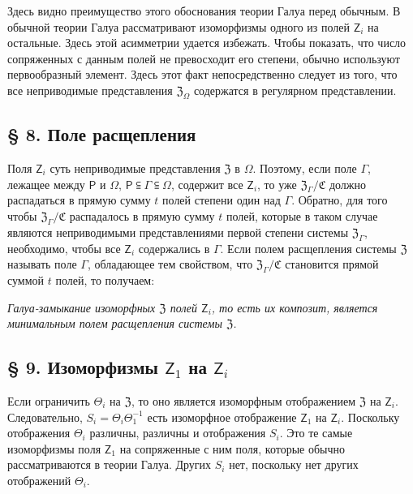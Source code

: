 \documentclass[11pt]{article}
\begin{document}
Здесь видно преимущество этого обоснования теории Галуа перед обычным. В обычной теории Галуа рассматривают изоморфизмы одного из полей \(\mathsf{Z}_i\) на остальные. Здесь этой асимметрии удается избежать. Чтобы показать, что число сопряженных с данным полей не превосходит его степени, обычно используют первообразный элемент. Здесь этот факт непосредственно следует из того, что все неприводимые представления \(\mathfrak Z_\Omega\) содержатся в регулярном представлении.

\subsection*{§ 8. Поле расщепления}\label{der-zerfaellungskoerper}

Поля \(\mathsf{Z}_i\) суть неприводимые представления \(\mathfrak Z\) в \(\Omega\). Поэтому, если поле \(\Gamma\), лежащее между \(\mathsf P\) и \(\Omega\), \(\mathsf P\subseteqq\Gamma\subseteqq\Omega\), содержит все \(\mathsf{Z}_i\), то уже \(\mathfrak Z_\Gamma/\mathfrak C\) должно распадаться в прямую сумму \(t\) полей степени один над \(\Gamma\). Обратно, для того чтобы \(\mathfrak Z_\Gamma/\mathfrak C\) распадалось в прямую сумму \(t\) полей, которые в таком случае являются неприводимыми представлениями первой степени системы \(\mathfrak Z_\Gamma\), необходимо, чтобы все \(\mathsf{Z}_i\) содержались в \(\Gamma\). Если полем расщепления системы \(\mathfrak Z\) называть поле \(\Gamma\), обладающее тем свойством, что \(\mathfrak Z_\Gamma/\mathfrak C\) становится прямой суммой \(t\) полей, то получаем:

\emph{Галуа-замыкание изоморфных \(\mathfrak Z\) полей \(\mathsf{Z}_i\), то есть их композит, является минимальным полем расщепления системы \(\mathfrak Z\).}

\subsection*{§ 9. Изоморфизмы \(\mathsf{Z}_1\) на \(\mathsf{Z}_i\)}\label{die-isomorphismen-von-z1-auf-die-zi}

Если ограничить \(\Theta_i\) на \(\mathfrak Z\), то оно является изоморфным отображением \(\mathfrak Z\) на \(\mathsf{Z}_i\). Следовательно, \(S_i=\Theta_i\Theta_1^{-1}\) есть изоморфное отображение \(\mathsf{Z}_1\) на \(\mathsf{Z}_i\). Поскольку отображения \(\Theta_i\) различны, различны и отображения \(S_i\). Это те самые изоморфизмы поля \(\mathsf{Z}_1\) на сопряженные с ним поля, которые обычно рассматриваются в теории Галуа. Других \(S_i\) нет, поскольку нет других отображений \(\Theta_i\).
\end{document}
